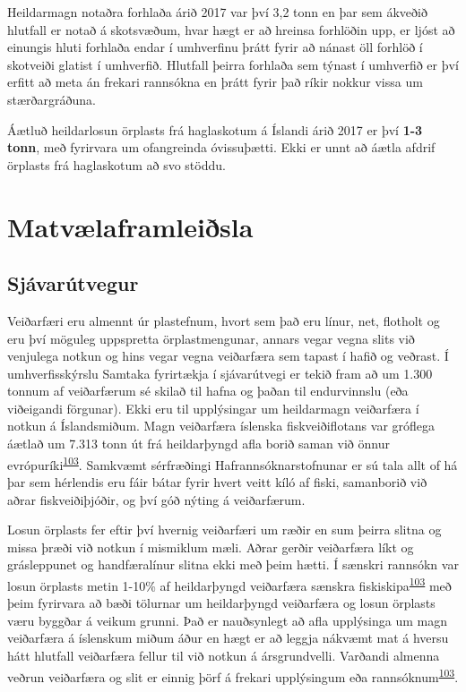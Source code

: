\documentclass[icelandic,]{book}
\begin{document}
Heildarmagn notaðra forhlaða árið 2017 var því 3,2 tonn en þar sem ákveðið hlutfall er notað á skotsvæðum, hvar hægt er að hreinsa forhlöðin upp, er ljóst að einungis hluti forhlaða endar í umhverfinu þrátt fyrir að nánast öll forhlöð í skotveiði glatist í umhverfið. Hlutfall þeirra forhlaða sem týnast í umhverfið er því erfitt að meta án frekari rannsókna en þrátt fyrir það ríkir nokkur vissa um stærðargráðuna.

Áætluð heildarlosun örplasts frá haglaskotum á Íslandi árið 2017 er því \textbf{1-3 tonn}, með fyrirvara um ofangreinda óvissuþætti. Ekki er unnt að áætla afdrif örplasts frá haglaskotum að svo stöddu.

\hypertarget{matvlaframleisla}{%
\section*{Matvælaframleiðsla}\label{matvlaframleisla}}

\hypertarget{sjavarutvegur}{%
\subsection*{Sjávarútvegur}\label{sjavarutvegur}}

Veiðarfæri eru almennt úr plastefnum, hvort sem það eru línur, net, flotholt og eru því möguleg uppspretta örplastmengunar, annars vegar vegna slits við venjulega notkun og hins vegar vegna veiðarfæra sem tapast í hafið og veðrast. Í umhverfisskýrslu Samtaka fyrirtækja í sjávarútvegi er tekið fram að um 1.300 tonnum af veiðarfærum sé skilað til hafna og þaðan til endurvinnslu (eða viðeigandi förgunar). Ekki eru til upplýsingar um heildarmagn veiðarfæra í notkun á Íslandsmiðum. Magn veiðarfæra íslenska fiskveiðiflotans var gróflega áætlað um 7.313 tonn út frá heildarþyngd afla borið saman við önnur evrópuríki\textsuperscript{\protect\hyperlink{ref-Hann2018}{103}}. Samkvæmt sérfræðingi Hafrannsóknarstofnunar er sú tala allt of há þar sem hérlendis eru fáir bátar fyrir hvert veitt kíló af fiski, samanborið við aðrar fiskveiðiþjóðir, og því góð nýting á veiðarfærum.

Losun örplasts fer eftir því hvernig veiðarfæri um ræðir en sum þeirra slitna og missa þræði við notkun í mismiklum mæli. Aðrar gerðir veiðarfæra líkt og grásleppunet og handfæralínur slitna ekki með þeim hætti. Í sænskri rannsókn var losun örplasts metin 1-10\% af heildarþyngd veiðarfæra sænskra fiskiskipa\textsuperscript{\protect\hyperlink{ref-Hann2018}{103}} með þeim fyrirvara að bæði tölurnar um heildarþyngd veiðarfæra og losun örplasts væru byggðar á veikum grunni. Það er nauðsynlegt að afla upplýsinga um magn veiðarfæra á íslenskum miðum áður en hægt er að leggja nákvæmt mat á hversu hátt hlutfall veiðarfæra fellur til við notkun á ársgrundvelli. Varðandi almenna veðrun veiðarfæra og slit er einnig þörf á frekari upplýsingum eða rannsóknum\textsuperscript{\protect\hyperlink{ref-Hann2018}{103}}.
\end{document}
